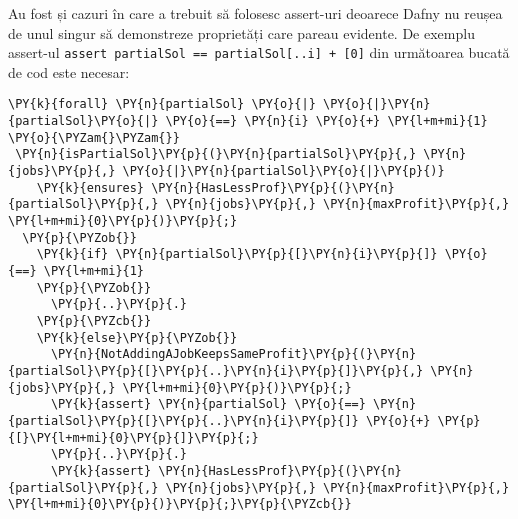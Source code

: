 \begin{enumerate}
Au fost și cazuri în care a trebuit să folosesc assert-uri deoarece Dafny nu reușea de unul singur să demonstreze proprietăți care pareau evidente. De exemplu assert-ul \texttt{assert partialSol == partialSol[..i] + [0]} din următoarea bucată de cod este necesar:
\begin{tiny}
\begin{Verbatim}[commandchars=\\\{\}, fontsize=\footnotesize]
\PY{k}{forall} \PY{n}{partialSol} \PY{o}{|} \PY{o}{|}\PY{n}{partialSol}\PY{o}{|} \PY{o}{==} \PY{n}{i} \PY{o}{+} \PY{l+m+mi}{1} \PY{o}{\PYZam{}\PYZam{}} 
 \PY{n}{isPartialSol}\PY{p}{(}\PY{n}{partialSol}\PY{p}{,} \PY{n}{jobs}\PY{p}{,} \PY{o}{|}\PY{n}{partialSol}\PY{o}{|}\PY{p}{)}
    \PY{k}{ensures} \PY{n}{HasLessProf}\PY{p}{(}\PY{n}{partialSol}\PY{p}{,} \PY{n}{jobs}\PY{p}{,} \PY{n}{maxProfit}\PY{p}{,} \PY{l+m+mi}{0}\PY{p}{)}\PY{p}{;}
  \PY{p}{\PYZob{}}
    \PY{k}{if} \PY{n}{partialSol}\PY{p}{[}\PY{n}{i}\PY{p}{]} \PY{o}{==} \PY{l+m+mi}{1}
    \PY{p}{\PYZob{}}
      \PY{p}{..}\PY{p}{.}
    \PY{p}{\PYZcb{}}
    \PY{k}{else}\PY{p}{\PYZob{}}
      \PY{n}{NotAddingAJobKeepsSameProfit}\PY{p}{(}\PY{n}{partialSol}\PY{p}{[}\PY{p}{..}\PY{n}{i}\PY{p}{]}\PY{p}{,} \PY{n}{jobs}\PY{p}{,} \PY{l+m+mi}{0}\PY{p}{)}\PY{p}{;}
      \PY{k}{assert} \PY{n}{partialSol} \PY{o}{==} \PY{n}{partialSol}\PY{p}{[}\PY{p}{..}\PY{n}{i}\PY{p}{]} \PY{o}{+} \PY{p}{[}\PY{l+m+mi}{0}\PY{p}{]}\PY{p}{;}
      \PY{p}{..}\PY{p}{.}
      \PY{k}{assert} \PY{n}{HasLessProf}\PY{p}{(}\PY{n}{partialSol}\PY{p}{,} \PY{n}{jobs}\PY{p}{,} \PY{n}{maxProfit}\PY{p}{,} \PY{l+m+mi}{0}\PY{p}{)}\PY{p}{;}\PY{p}{\PYZcb{}}
\end{Verbatim}
\end{tiny}
\end{enumerate}


















